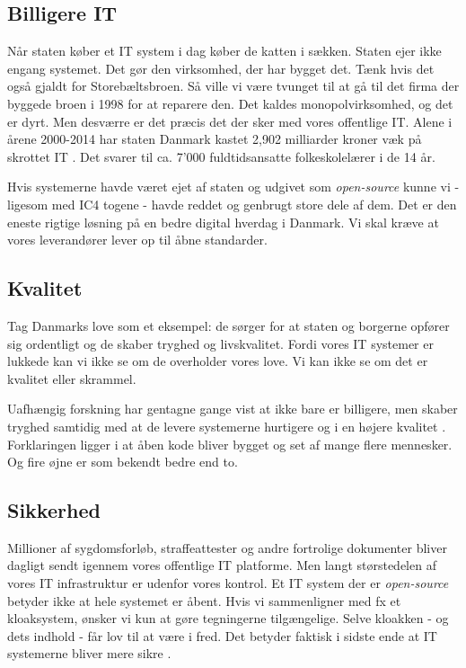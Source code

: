 \documentclass[fleqn]{article}
\begin{document}
\subsection{Billigere IT}
Når staten køber et IT system i dag køber de katten i sækken. Staten ejer ikke engang
systemet. Det gør den virksomhed, der har bygget det. Tænk hvis det også gjaldt for
Storebæltsbroen. Så ville vi være tvunget til at gå til det firma der byggede
broen i 1998 for at reparere den. Det kaldes monopolvirksomhed, og det er dyrt.
Men desværre er det præcis det der sker med vores offentlige IT. Alene i årene 
2000-2014 har staten Danmark kastet 2,902 milliarder kroner væk på skrottet IT
\cite{dr8}. Det svarer til ca. 7'000 fuldtidsansatte folkeskolelærer i de 14 år.

Hvis systemerne havde været ejet af staten og udgivet som \textit{open-source} kunne vi
- ligesom med IC4 togene - havde reddet og genbrugt store dele af dem. 
Det er den eneste rigtige løsning på en bedre digital hverdag i Danmark. Vi skal kræve
at vores leverandører lever op til åbne standarder. 

\subsection{Kvalitet}
Tag Danmarks love som et eksempel: de sørger for at staten og borgerne opfører sig 
ordentligt og de skaber tryghed og livskvalitet. Fordi vores IT systemer er lukkede
kan vi ikke se om de overholder vores love. Vi kan ikke se om det er kvalitet eller skrammel.

Uafhængig forskning har gentagne gange vist at  ikke bare er billigere,
men skaber tryghed samtidig med at de levere systemerne hurtigere og i en højere kvalitet \cite{Samoladas, Reynolds}.
Forklaringen ligger i at åben kode bliver bygget og set af mange flere mennesker. Og fire
øjne er som bekendt bedre end to.

\subsection{Sikkerhed}
Millioner af sygdomsforløb, straffeattester og andre fortrolige
dokumenter bliver dagligt sendt igennem vores offentlige IT platforme. Men langt størstedelen
af vores IT infrastruktur er udenfor vores kontrol.
Et IT system der er \textit{open-source} betyder ikke at hele systemet er åbent. 
Hvis vi sammenligner med fx et kloaksystem, ønsker vi kun at gøre tegningerne
tilgængelige. Selve kloakken - og dets indhold - får lov til at være i fred.
Det betyder faktisk i sidste ende at IT systemerne bliver mere sikre \cite{Samoladas, Reynolds}.
\end{document}
